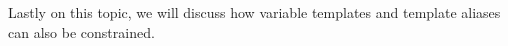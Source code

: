 Lastly on this topic, we will discuss how variable templates and template aliases can also be constrained.




































































